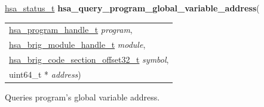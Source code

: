 \documentclass[final]{book}
\newcommand{\hsaarg}[1]{\textit{#1}}
\begin{document}
\begin{appendices}
\noindent\begin{tcolorbox}[breakable,nobeforeafter,colframe=white,colback=lightgray,left=0mm]
\hyperlink{group--status-1gad755322e7ff95456520e8abdbe90d225}{hsa_status_t} \hypertarget{group--HsailLinkerServiceLayer-1ga351f87c9d8322cb679a12a06adc6d47a}{\textbf{hsa_query_program_global_variable_address}}(
\vspace{-3.5mm}\begin{longtable}{@{}p{\textwidth}}
\hspace{1.7em}\hyperlink{group--HsailLinkerServiceLayer-1ga7b28ca39da981be49aac99608eb386cb}{hsa_program_handle_t} \hsaarg{program},\\
\hspace{1.7em}\hyperlink{group--FinalizerCoreApi-1gafaea8b9ab368c499b58375f02f4b178b}{hsa_brig_module_handle_t} \hsaarg{module},\\
\hspace{1.7em}\hyperlink{group--FinalizerCoreApi-1ga975ce5cee53438ed8dc078f3e1dfbc04}{hsa_brig_code_section_offset32_t} \hsaarg{symbol},\\
\hspace{1.7em}uint64_t * \hsaarg{address})\end{longtable}

\end{tcolorbox}
Queries program's global variable address.


\end{appendices}
\end{document}
